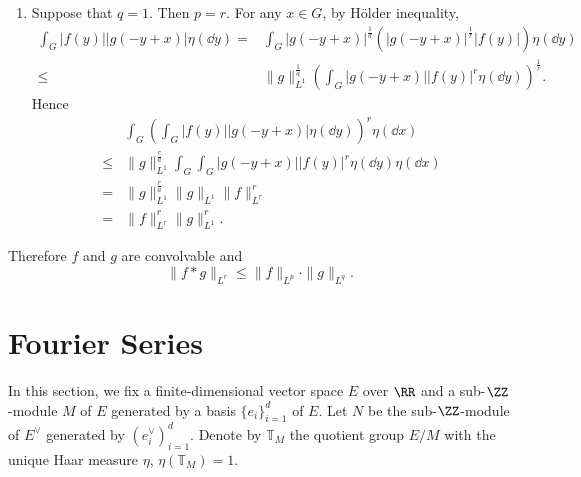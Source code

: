 \begin{proofenv}
\begin{enumerate}
\begin{enumerate}
$$\begin{aligned}
                        \int_G\int_G |f(y)| |g(-y+x)|^r \eta(\dd y)\eta(\dd x)\\
                        = & \|f\|_{L^1}^{\frac{r}{b}} \|f\|_{L^1}\|g\|_{L^r}^r\\
                        = & \|f\|_{L^1}^r\|g\|_{L^r}^r.
                    \end{aligned}$$
                \item Suppose that $q=1$. Then $p=r$.
                    For any $x \in G$, by Hölder inequality,
                    $$\begin{aligned}
                        \int_G |f(y)| |g(-y+x)| \eta(\dd y)
                        = & \int_G |g(-y+x)|^{\frac{1}{a}}\left(|g(-y+x)|^{\frac{1}{r}} |f(y)|\right)\eta(\dd y)\\
                        \le & \|g\|_{L^1}^{\frac{1}{a}}
                        \left(\int_G |g(-y+x)| |f(y)|^r \eta(\dd y)\right)^{\frac{1}{r}}.
                    \end{aligned}$$
                    Hence
                    $$\begin{aligned}
                        & \int_G\left(\int_G |f(y)| |g(-y+x)|\eta(\dd y)\right)^r \eta(\dd x)\\
                        \le & \|g\|_{L^1}^{\frac{r}{a}}
                        \int_G\int_G |g(-y+x)| |f(y)|^r \eta(\dd y)\eta(\dd x)\\
                        = & \|g\|_{L^1}^{\frac{r}{a}} \|g\|_{L^1}\|f\|_{L^r}^r\\
                        = & \|f\|_{L^r}^r\|g\|_{L^1}^r.
                    \end{aligned}$$
            \end{enumerate}
            Therefore $f$ and $g$ are convolvable and
            $$\|f*g\|_{L^r} \le \|f\|_{L^p} \cdot \|g\|_{L^q}.$$
    \end{enumerate}
\end{proofenv}


\section{Fourier Series}
In this section, we fix a finite-dimensional vector space $E$ over $\RR$ and a sub-$\ZZ$-module $M$ of $E$ generated by a basis $\{e_i\}_{i=1}^{d}$ of $E$.
Let $N$ be the sub-$\ZZ$-module of $E^\vee$ generated by $(e^\vee_i)_{i=1}^{d}$.
Denote by $\mathbb{T}_{M}$ the quotient group $E/M$ with the unique Haar measure $\eta$, $\eta(\mathbb{T}_M) = 1$.

